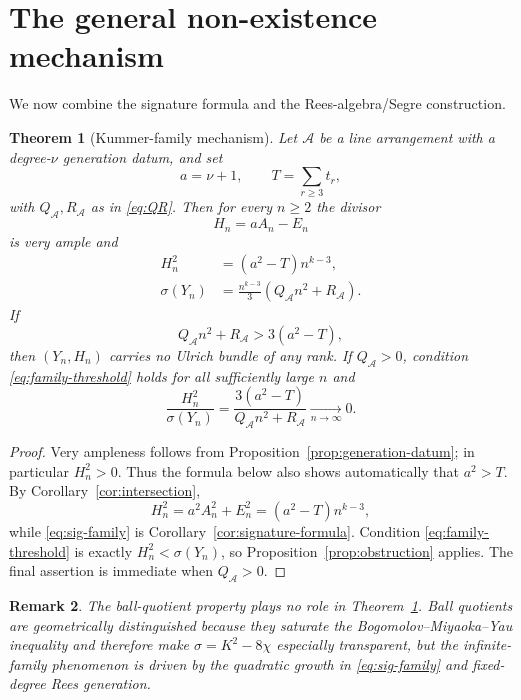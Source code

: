 \documentclass[11pt]{article}
\newtheorem{theorem}{Theorem}[section]
\newtheorem{remark}[theorem]{Remark}
\newcommand{\cA}{\mathcal A}
\newcommand{\sig}{\sigma}
\begin{document}
\section{The general non-existence mechanism}\label{sec:mechanism}

We now combine the signature formula and the Rees-algebra/Segre construction.

\begin{theorem}[Kummer-family mechanism]\label{thm:kummer-family}
Let $\cA$ be a line arrangement with a degree-$\nu$ generation datum, and set
\[
 a=\nu+1,
 \qquad
 T=\sum_{r\ge3}t_r,
\]
with $Q_{\cA},R_{\cA}$ as in \eqref{eq:QR}.  Then for every $n\ge2$ the divisor
\[
        H_n=aA_n-E_n
\]
is very ample and
\begin{align}
 H_n^2&=(a^2-T)n^{k-3},\label{eq:H2-family}\\
 \sig(Y_n)&=\frac{n^{k-3}}3(Q_{\cA}n^2+R_{\cA}).\label{eq:sig-family}
\end{align}
If
\begin{equation}\label{eq:family-threshold}
        Q_{\cA}n^2+R_{\cA}>3(a^2-T),
\end{equation}
then $(Y_n,H_n)$ carries no Ulrich bundle of any rank.
If $Q_{\cA}>0$, condition \eqref{eq:family-threshold} holds for all sufficiently
large $n$ and
\begin{equation}\label{eq:ratio-family}
 \frac{H_n^2}{\sig(Y_n)}
 =\frac{3(a^2-T)}{Q_{\cA}n^2+R_{\cA}}
 \xrightarrow[n\to\infty]{}0.
\end{equation}
\end{theorem}

\begin{proof}
Very ampleness follows from Proposition~\ref{prop:generation-datum}; in particular
$H_n^2>0$.  Thus the formula below also shows automatically that
$a^2>T$.  By Corollary~\ref{cor:intersection},
\[
 H_n^2=a^2A_n^2+E_n^2
       =(a^2-T)n^{k-3},
\]
while \eqref{eq:sig-family} is Corollary~\ref{cor:signature-formula}.
Condition \eqref{eq:family-threshold} is exactly $H_n^2<\sig(Y_n)$, so
Proposition~\ref{prop:obstruction} applies.  The final assertion is immediate
when $Q_{\cA}>0$.
\end{proof}

\begin{remark}\label{rem:not-ball-essential}
The ball-quotient property plays no role in Theorem~\ref{thm:kummer-family}.
Ball quotients are geometrically distinguished because they saturate the
Bogomolov--Miyaoka--Yau inequality \cite{Miyaoka1977,Yau1977} and therefore make
$\sig=K^2-8\chi$ especially transparent, but the infinite-family phenomenon is
driven by the quadratic growth in \eqref{eq:sig-family} and fixed-degree
Rees generation.
\end{remark}
\end{document}
